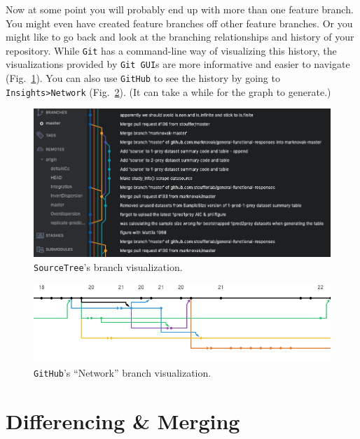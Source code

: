\documentclass[12pt,letterpaper]{article}
\begin{document}
Now at some point you will probably end up with more than one feature branch.
You might even have created feature branches off other feature branches.
Or you might like to go back and look at the branching relationships and history of your repository.
While \texttt{Git} has a command-line way of visualizing this history, the visualizations provided by \texttt{Git GUI}s are more informative and easier to navigate (Fig.~\ref{fig:stbranch}).
You can also use \texttt{GitHub} to see the history by going to \texttt{Insights>Network} (Fig.~\ref{fig:ghbranch}).
(It can take a while for the graph to generate.)

\begin{figure}[h]
	\centering
	\includegraphics[width=0.8\linewidth]{figs/SourceTree_branches.png}
	\caption{\texttt{SourceTree}'s branch visualization.}
	\label{fig:stbranch}
\end{figure}

\begin{figure}[h]
	\centering
	\includegraphics[width=1\linewidth]{figs/GitHub_branches.png}
	\caption{\texttt{GitHub}'s ``Network'' branch visualization.}
	\label{fig:ghbranch}
\end{figure}



\section{Differencing \& Merging}
\end{document}
